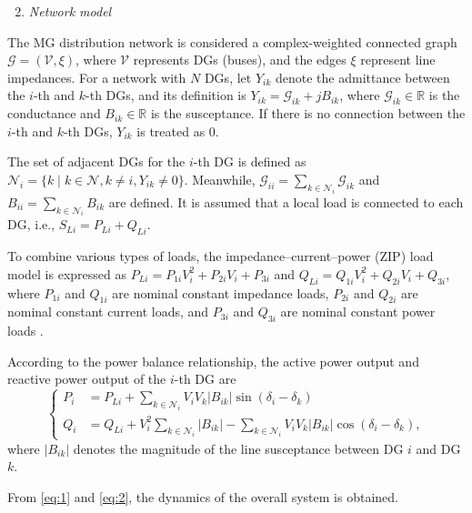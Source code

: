\documentclass[]{interact}
\theoremstyle{plain}%
\theoremstyle{definition}
\theoremstyle{remark}
\begin{document}
\begin{enumerate}
    \setcounter{enumi}{1}
    \item \textit{Network model}
\end{enumerate}

The MG distribution network is considered a complex-weighted connected graph \(\mathcal{G} = (\mathcal{V}, \xi) \), where \(\mathcal{V}\) represents DGs (buses), and the edges \(\xi\) represent line impedances. 
For a network with \(N\) DGs, let \(Y_{ik}\) denote the admittance between the \(i\)-th and \(k\)-th DGs, and its definition is \(Y_{ik} = \mathcal{G}_{ik} + jB_{ik}\), where \(\mathcal{G}_{ik} \in \mathbb{R}\) is the conductance and \(B_{ik} \in \mathbb{R}\) is the susceptance. 
If there is no connection between the \(i\)-th and \(k\)-th DGs, \(Y_{ik}\) is treated as 0.   

The set of adjacent DGs for the \( i \)-th DG is defined as \( \mathcal{N}_i = \{ k \mid k \in \mathcal{N}, k \neq i, Y_{ik} \neq 0 \} \). Meanwhile, \( \mathcal{G}_{ii} = \sum_{k \in \mathcal{N}_i} \mathcal{G}_{ik} \) and \( B_{ii} = \sum_{k \in \mathcal{N}_i} B_{ik} \) are defined. It is assumed that a local load is connected to each DG, i.e., \( S_{Li} = P_{Li} + Q_{Li} \).
    
To combine various types of loads, the impedance–current–power (ZIP) load model is  expressed as $P_{Li} = P_{1i}V_i^2 + P_{2i}V_i + P_{3i}$ and $Q_{Li} = Q_{1i}V_i^2 + Q_{2i}V_i + Q_{3i}$, where \( P_{1i} \) and \( Q_{1i} \) are nominal constant impedance loads, \( P_{2i} \) and \( Q_{2i} \) are nominal constant current loads, and \( P_{3i} \) and \( Q_{3i} \) are nominal constant power loads \citep{Adiche2024}. 

According to the power balance relationship, the active power output and reactive power output of the \( i \)-th DG are
\begin{equation}
\label{eq:2}
\left\{
\begin{aligned}
    P_i &= P_{Li} + \sum_{k \in \mathcal{N}_i} V_i V_k |B_{ik}| \sin(\delta_i - \delta_k) \\
    Q_i &= Q_{Li} + V_i^2 \sum_{k \in \mathcal{N}_i} |B_{ik}| - \sum_{k \in \mathcal{N}_i} V_i V_k |B_{ik}| \cos(\delta_i - \delta_k),
\end{aligned}
\right.
\end{equation}
where $|B_{ik}|$ denotes the magnitude of the line susceptance between DG $i$ and DG $k$.

From \eqref{eq:1} and \eqref{eq:2}, the dynamics of the overall system is obtained.     
\end{document}
